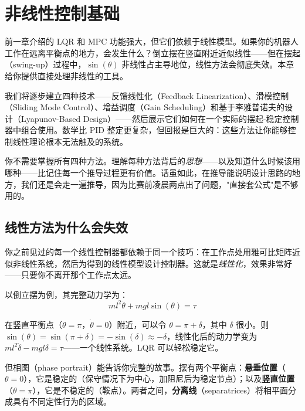 \section{非线性控制基础}

前一章介绍的 LQR 和 MPC 功能强大，但它们依赖于线性模型。如果你的机器人工作在远离平衡点的地方，会发生什么？倒立摆在竖直附近近似线性——但在摆起（swing-up）过程中，$\sin(\theta)$ 非线性占主导地位，线性方法会彻底失效。本章给你提供直接处理非线性的工具。

我们将逐步建立四种技术——反馈线性化（Feedback Linearization）、滑模控制（Sliding Mode Control）、增益调度（Gain Scheduling）和基于李雅普诺夫的设计（Lyapunov-Based Design）——然后展示它们如何在一个实际的摆起-稳定控制器中组合使用。数学比 PID 整定更复杂，但回报是巨大的：这些方法让你能够控制线性理论根本无法触及的系统。

你不需要掌握所有四种方法。理解每种方法背后的\textit{思想}——以及知道什么时候该用哪种——比记住每一个推导过程更有价值。话虽如此，在推导能说明设计思路的地方，我们还是会走一遍推导，因为比赛前凌晨两点出了问题，"直接套公式"是不够用的。

\subsection{线性方法为什么会失效}

你之前见过的每一个线性控制器都依赖于同一个技巧：在工作点处用雅可比矩阵近似非线性系统，然后为得到的线性模型设计控制器。这就是\textit{线性化}，效果非常好——只要你不离开那个工作点太远。

以倒立摆为例，其完整动力学为：
\begin{equation}
ml^2 \ddot{\theta} + mgl\sin(\theta) = \tau
\end{equation}

在竖直平衡点（$\theta = \pi$，$\dot{\theta} = 0$）附近，可以令 $\theta = \pi + \delta$，其中 $\delta$ 很小。则 $\sin(\theta) = \sin(\pi + \delta) = -\sin(\delta) \approx -\delta$，线性化后的动力学变为 $ml^2 \ddot{\delta} - mgl\delta = \tau$——一个线性系统。LQR 可以轻松稳定它。

但相图（phase portrait）能告诉你完整的故事。摆有两个平衡点：\textbf{悬垂位置}（$\theta = 0$），它是稳定的（保守情况下为中心，加阻尼后为稳定节点）；以及\textbf{竖直位置}（$\theta = \pi$），它是不稳定的（鞍点）。两者之间，\textbf{分离线}（separatrices）将相平面分成具有不同定性行为的区域。

